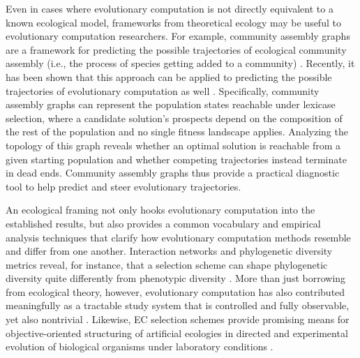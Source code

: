 Even in cases where evolutionary computation is not directly equivalent to a known ecological model, frameworks from theoretical ecology may be useful to evolutionary computation researchers.
For example, community assembly graphs are a framework for predicting the possible trajectories of ecological community assembly (i.e., the process of species getting added to a community) \citep{hangkwang1993assembly,servan2021tractable}.
Recently, it has been shown that this approach can be applied to predicting the possible trajectories of evolutionary computation as well \citep{dolson2024reachability}.
Specifically, community assembly graphs can represent the population states reachable under lexicase selection, where a candidate solution's prospects depend on the composition of the rest of the population and no single fitness landscape applies.
Analyzing the topology of this graph reveals whether an optimal solution is reachable from a given starting population and whether competing trajectories instead terminate in dead ends.
Community assembly graphs thus provide a practical diagnostic tool to help predict and steer evolutionary trajectories.

An ecological framing not only hooks evolutionary computation into the established results, but also provides a common vocabulary and empirical analysis techniques that clarify how evolutionary computation methods resemble and differ from one another.
Interaction networks and phylogenetic diversity metrics reveal, for instance, that a selection scheme can shape phylogenetic diversity quite differently from phenotypic diversity \citep{dolson2018ecological}.
More than just borrowing from ecological theory, however, evolutionary computation has also contributed meaningfully as a tractable study system that is controlled and fully observable, yet also nontrivial \citep{dolson2021digital}.
Likewise, EC selection schemes provide promising means for objective-oriented structuring of artificial ecologies in directed and experimental evolution of biological organisms under laboratory conditions \citep{lalejini2022artificial}.



